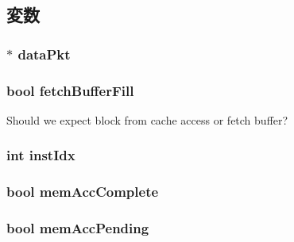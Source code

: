 \subsection{変数}
\hypertarget{classCacheRequest_a9b285fe0ef029e701369de8a6e7ed341}{
\subsubsection[{dataPkt}]{$\ast$ {\bf dataPkt}}}
\label{classCacheRequest_a9b285fe0ef029e701369de8a6e7ed341}
\hypertarget{classCacheRequest_a2b7f1ab2876d712b08792af773ace20e}{
\subsubsection[{fetchBufferFill}]{\setlength{\rightskip}{0pt plus 5cm}bool {\bf fetchBufferFill}}}
\label{classCacheRequest_a2b7f1ab2876d712b08792af773ace20e}
Should we expect block from cache access or fetch buffer? \hypertarget{classCacheRequest_a65152017e4eb674a60e1b6c374b2df6f}{
\subsubsection[{instIdx}]{\setlength{\rightskip}{0pt plus 5cm}int {\bf instIdx}}}
\label{classCacheRequest_a65152017e4eb674a60e1b6c374b2df6f}
\hypertarget{classCacheRequest_af160acb6943c568a0acf532b050ef6a4}{
\subsubsection[{memAccComplete}]{\setlength{\rightskip}{0pt plus 5cm}bool {\bf memAccComplete}}}
\label{classCacheRequest_af160acb6943c568a0acf532b050ef6a4}
\hypertarget{classCacheRequest_aa3141bc66d01fac90a0d8ef27257a26e}{
\subsubsection[{memAccPending}]{\setlength{\rightskip}{0pt plus 5cm}bool {\bf memAccPending}}}
